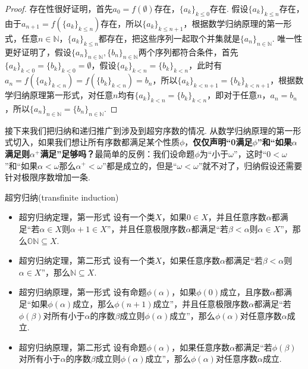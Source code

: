 \begin{proof}
    存在性很好证明，首先\(a_0 = f(\emptyset)\)存在，\(\{a_k\}_{k \leq 0}\)存在. 假设\(\{a_k\}_{k \leq n}\)存在，由于\(a_{n+1} = f(\{a_k\}_{k \leq n})\)存在，所以\(\{a_k\}_{k \leq n+1}\)，根据数学归纳原理的第一形式，任意\(n \in \mathbb{N}\)，\(\{a_k\}_{k \leq n}\)都存在，把这些序列一起取个并集就是\(\{a_n\}_{n \in \mathbb{N}}\). \newline
    唯一性更好证明了，假设\(\{a_n\}_{n \in \mathbb{N}}, \{b_n\}_{n \in \mathbb{N}}\)两个序列都符合条件，首先\(\{a_k\}_{k < 0} = \{b_k\}_{k < 0} = \emptyset\)，假设\(\{a_k\}_{k < n} = \{b_k\}_{k < n}\)，此时有\(a_n = f(\{a_k\}_{k < n}) = f(\{b_k\}_{k < n}) = b_n\)，所以\(\{a_k\}_{k < n+1} = \{b_k\}_{k < n+1}\)，根据数学归纳原理第一形式，对任意\(n\)均有\(\{a_k\}_{k < n} = \{b_k\}_{k < n}\)，即对于任意\(n\)，\(a_n = b_n\)，所以\(\{a_n\}_{n \in \mathbb{N}} = \{b_n\}_{n \in \mathbb{N}}\).
\end{proof}

接下来我们把归纳和递归推广到涉及到超穷序数的情况. 从数学归纳原理的第一形式切入，如果我们想让所有序数都满足某个性质\(\phi\)，\textbf{仅仅声明“0满足\(\phi\)”和“如果\(\alpha\)满足则\(\alpha^+\)满足”足够吗？}最简单的反例：我们设命题\(\phi\)为“小于\(\omega\)”，这时“\(0 < \omega\)”和“如果\(\alpha < \omega\)那么\(\alpha^+ < \omega\)”都是成立的，但是“\(\omega < \omega\)”就不对了，归纳假设还需要针对极限序数增加一条.

\begin{theorem}{超穷归纳(transfinite induction)}
    \begin{itemize}
        \item 超穷归纳定理，第一形式 \newline
        设有一个类\(X\)，如果\(0 \in X\)，并且任意序数\(\alpha\)都满足“若\(\alpha \in X\)则\(\alpha+1 \in X\)”，并且任意极限序数\(\alpha\)都满足“若\(\beta < \alpha\)则\(\alpha \in X\)”，那么\(\mathbb{ON} \subseteq X\).
        \item 超穷归纳定理，第二形式 \newline
        设有一个类\(X\)，如果任意序数\(\alpha\)都满足“若\(\beta < \alpha\)则\(\alpha \in X\)”，那么\(\mathbb{N} \subseteq X\).
        \item 超穷归纳原理，第一形式 \newline
        设有命题\(\phi(\alpha)\)，如果\(\phi(0)\)成立，且序数\(\alpha\)都满足“如果\(\phi(\alpha)\)成立，那么\(\phi(n+1)\)成立”，并且任意极限序数\(\alpha\)都满足“若\(\phi(\beta)\)对所有小于\(\alpha\)的序数\(\beta\)成立则\(\phi(\alpha)\)成立”，那么\(\phi(\alpha)\)对任意序数\(\alpha\)成立.
        \item 超穷归纳原理，第二形式 \newline
        设有命题\(\phi(\alpha)\)，如果任意序数\(\alpha\)都满足“若\(\phi(\beta)\)对所有小于\(\alpha\)的序数\(\beta\)成立则\(\phi(\alpha)\)成立”，那么\(\phi(\alpha)\)对任意序数\(\alpha\)成立.
    \end{itemize}
\end{theorem}

